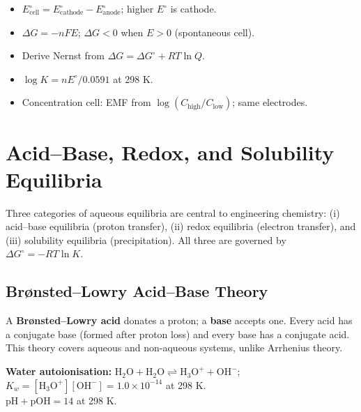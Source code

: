 \documentclass[12pt,a4paper]{article}
\begin{document}
\begin{tcolorbox}[exambox, title={Exam Points (Section 4)}]
\begin{itemize}[leftmargin=*, itemsep=2pt, topsep=2pt]
  \item $E^\circ_{\mathrm{cell}} = E^\circ_{\mathrm{cathode}} - E^\circ_{\mathrm{anode}}$; higher $E^\circ$ is cathode.
  \item $\Delta G = -nFE$; $\Delta G < 0$ when $E > 0$ (spontaneous cell).
  \item Derive Nernst from $\Delta G = \Delta G^\circ + RT\ln Q$.
  \item $\log K = n E^\circ / 0.0591$ at 298 K.
  \item Concentration cell: EMF from $\log(C_{\mathrm{high}}/C_{\mathrm{low}})$; same electrodes.
\end{itemize}
\end{tcolorbox}

\section{Acid--Base, Redox, and Solubility Equilibria}

\begin{tcolorbox}[defbox]
Three categories of aqueous equilibria are central to engineering chemistry: (i) acid--base equilibria (proton transfer), (ii) redox equilibria (electron transfer), and (iii) solubility equilibria (precipitation). All three are governed by $\Delta G^\circ = -RT\ln K$.
\end{tcolorbox}

\subsection{Br\o{}nsted--Lowry Acid--Base Theory}
\begin{tcolorbox}[defbox]
A \textbf{Br\o{}nsted--Lowry acid} donates a proton; a \textbf{base} accepts one. Every acid has a conjugate base (formed after proton loss) and every base has a conjugate acid. This theory covers aqueous and non-aqueous systems, unlike Arrhenius theory.
\end{tcolorbox}

\textbf{Water autoionisation:} $\mathrm{H_2O + H_2O \rightleftharpoons H_3O^+ + OH^-}$; $K_w = [\mathrm{H_3O^+}][\mathrm{OH^-}] = 1.0\times10^{-14}$ at 298 K.\\
$\mathrm{pH} + \mathrm{pOH} = 14$ at 298 K.
\end{document}
